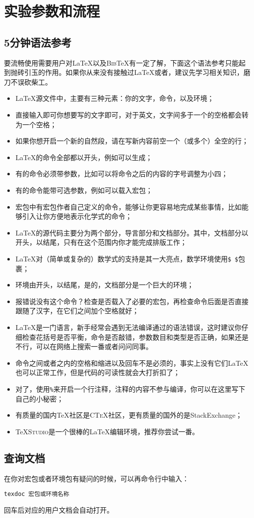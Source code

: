 \chapter{实验参数和流程}
\section{5分钟语法参考}

{\kaishu 要流畅使用\PRCthesis 需要用户对\LaTeX 以及\textsc{Bib}\TeX 有一定了解，下面这个语法参考只能起到抛砖引玉的作用。如果你从来没有接触过\LaTeX 或者\XeTeX ，建议先学习相关知识，磨刀不误砍柴工。}
\medskip
\begin{itemize}
	\item \LaTeX 源文件中，主要有三种元素：你的文字，命令，以及环境；
	\item 直接输入即可你想要写的文字即可，对于英文，文字间多于一个的空格都会转为一个空格；
	\item 如果你想开启一个新的自然段，请在写新内容前空一个（或多个）全空的行；
	\item \LaTeX 的命令{\heiti 全部}都以\cs{ }开头，例如可以生成\XeTeX ；
	\item 有的命令{\heiti 必须}带参数，比如可以将命令之后的内容的字号调整为小四；
	\item 有的命令能带可选参数，例如可以载入宏包；
	\item 宏包中有宏包作者自己定义的命令，能够让你更容易地完成某些事情，比如能够引入让你方便地表示化学式的命令；
	\item \LaTeX 的源代码主要分为两个部分，导言部分和文档部分。其中，文档部分以开头，以结尾，只有在这个范围内你才能完成排版工作；
	\item \LaTeX 对（简单或复杂的）数学式的支持是其一大亮点，数学环境使用\texttt{\${ }\$}包裹；
	\item 环境由开头，以结尾，是的，文档部分是一个巨大的环境；
	\item 报错说没有这个命令？检查是否载入了必要的宏包，再检查命令后面是否直接跟随了汉字，在它们之间加个空格就好；
	\item \LaTeX 是一门语言，新手经常会遇到无法编译通过的语法错误，这时建议你仔细检查花括号是否平衡，命令是否敲错，参数数目和类型是否正确，如果还是不行，可以在网络上搜索一番或者问问同事。
	\item 命令之间或者之内的空格和缩进以及回车不是必须的，事实上没有它们\LaTeX 也可以正常工作，但是代码的可读性就会大打折扣了；
	\item 对了，使用\texttt{\%}来开启一个行注释，注释的内容不参与编译，你可以在这里写下自己的小秘密；
	\item 有质量的国内\TeX 社区是\textsc{CTeX}社区，更有质量的国外的是\textsf{StackExchange}；
	\item \TeX\textsc{Studio}是一个很棒的\LaTeX 编辑环境，推荐你尝试一番。
\end{itemize}

\section{查询文档}
在你对宏包或者环境包有疑问的时候，可以再命令行中输入：

\texttt{texdoc 宏包或环境名称}

回车后对应的用户文档会自动打开。





